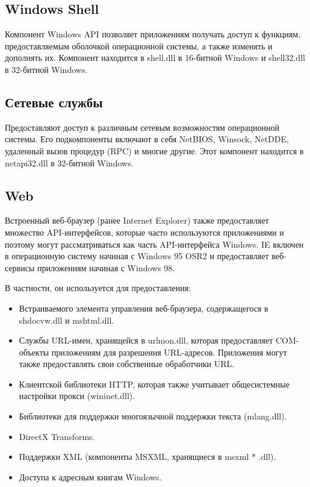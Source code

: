     \subsection{Windows Shell}
    Компонент Windows API позволяет приложениям получать доступ к функциям, предоставляемым оболочкой операционной системы, а также изменять и дополнять их.
    Компонент находится в shell.dll в 16-битной Windows и shell32.dll в 32-битной Windows.

    \subsection{Сетевые службы}
    Предоставляют доступ к различным сетевым возможностям операционной системы.
    Его подкомпоненты включают в себя NetBIOS, Winsock, NetDDE, удаленный вызов процедур (RPC) и многие другие.
    Этот компонент находится в netapi32.dll в 32-битной Windows.

    \subsection{Web}
    Встроенный веб-браузер (ранее Internet Explorer) также предоставляет множество API-интерфейсов, которые часто используются приложениями и поэтому могут рассматриваться как часть API-интерфейса Windows.
    IE включен в операционную систему начиная с Windows 95 OSR2 и предоставляет веб-сервисы приложениям начиная с Windows 98.\linebreak

    В частности, он используется для предоставления:

    \begin{itemize}
        \item Встраиваемого элемента управления веб-браузера, содержащегося в shdocvw.dll и mshtml.dll.
        \item Службы URL-имен, хранящейся в urlmon.dll, которая предоставляет COM-объекты приложениям для разрешения URL-адресов. Приложения могут также предоставлять свои собственные обработчики URL.
        \item Клиентской библиотеки HTTP, которая также учитывает общесистемные настройки прокси (wininet.dll).
        \item Библиотеки для поддержки многоязычной поддержки текста (mlang.dll).
        \item DirectX Transforms.
        \item Поддержки XML (компоненты MSXML, хранящиеся в msxml * .dll).
        \item Доступа к адресным книгам Windows.
    \end{itemize}


